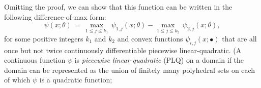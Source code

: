 \documentclass{siamart}
\newcommand{\epc}{\hspace{1pc}}
\begin{document}
Omitting the proof, we can show that this function can be written in the following difference-of-max form:
\begin{equation} \label{eq:dcp}
\psi(x;\theta) \, = \, \displaystyle{
\max_{1 \leq j \leq k_1}
} \, \psi_{1,j}(x;\theta) - \displaystyle{
\max_{1 \leq j \leq k_2}
} \, \psi_{2,j}(x;\theta),
\end{equation}
for some positive integers $k_1$ and $k_2$ and convex functions $\psi_{i,j}(x;\bullet)$ that are all once
but not twice continuously differentiable piecewise linear-quadratic.  (A continuous function $\psi$ is {\sl piecewise linear-quadratic} (PLQ) \cite[Definition 10.20]{RockafellarRWets98}
on a domain if the domain
can be represented as the union of finitely many polyhedral sets %
on each of which  $\psi$ is a quadratic function;
\end{document}
